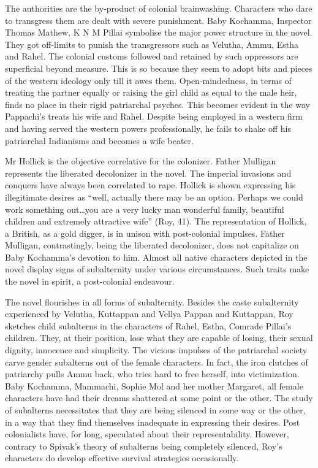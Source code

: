 The authorities are the by-product of colonial brainwashing. Characters who dare to transgress them are dealt with severe punishment. Baby Kochamma, Inspector Thomas Mathew, K N M Pillai symbolise the major power structure in the novel. They got off-limits to punish the transgressors such as Velutha, Ammu, Estha and Rahel. The colonial customs followed and retained by such oppressors are superficial beyond measure. This is so because they seem to adopt bits and pieces of the western ideology only till it awes them. Open-mindedness, in terms of treating the partner equally or raising the girl child as equal to the male heir, finds no place in their rigid patriarchal psyches. This becomes evident in the way Pappachi’s treats his wife and Rahel. Despite being employed in a western firm and having served the western powers professionally, he fails to shake off his patriarchal Indianisms and becomes a wife beater. 

Mr Hollick is the objective correlative for the colonizer. Father Mulligan represents the liberated decolonizer in the novel. The imperial invasions and conquers have always been correlated to rape. Hollick is shown expressing his illegitimate desires as “well, actually there may be an option. Perhaps we could work something out…you are a very lucky man wonderful family, beautiful children and extremely attractive wife” (Roy, 41). The representation of Hollick, a British, as a gold digger, is in unison with post-colonial impulses. Father Mulligan, contrastingly, being the liberated decolonizer, does not capitalize on Baby Kochamma’s devotion to him. Almost all native characters depicted in the novel display signs of subalternity under various circumstances. Such traits make the novel in spirit, a post-colonial endeavour. 

The novel flourishes in all forms of subalternity. Besides the caste subalternity experienced by Velutha, Kuttappan and Vellya Pappan and Kuttappan, Roy sketches child subalterns in the characters of Rahel, Estha, Comrade Pillai’s children. They, at their position, lose what they are capable of losing, their sexual dignity, innocence and simplicity. The vicious impulses of the patriarchal society carve gender subalterns out of the female characters. In fact, the iron clutches of patriarchy pulls Ammu back, who tries hard to free herself, into victimization. Baby Kochamma, Mammachi, Sophie Mol and her mother Margaret, all female characters have had their dreams shattered at some point or the other. The study of subalterns necessitates that they are being silenced in some way or the other, in a way that they find themselves inadequate in expressing their desires. Post colonialists have, for long, speculated about their representability. However, contrary to Spivak’s theory of subalterns being completely silenced, Roy’s characters do develop effective survival strategies occasionally. 

